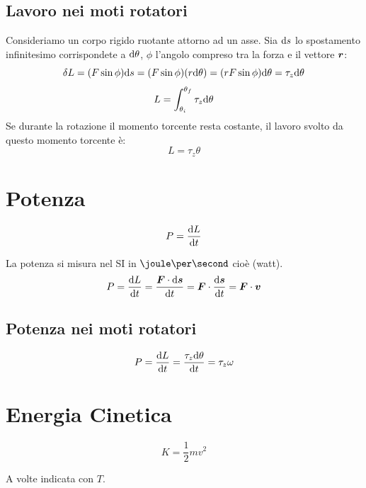 \subsection{Lavoro nei moti rotatori}
Consideriamo un corpo rigido ruotante attorno ad un asse. Sia $\mathrm{d} s$ lo spostamento
infinitesimo corrispondete a $\mathrm{d} \theta$, $\phi$ l'angolo
compreso tra la forza e il vettore $\boldsymbol{r}$:
\begin{equation*}
\delta L=(F\sin \phi)\mathrm{d} s=(F \sin \phi)(r
\mathrm{d}\theta)=(rF\sin\phi)\mathrm{d} \theta=\tau_z\mathrm{d}\theta
\end{equation*}
\begin{equation*}L=\int_{\theta_i}^{\theta_f}\tau_z\mathrm{d}\theta\end{equation*}
Se durante la rotazione il momento torcente resta costante, il
lavoro svolto da questo momento torcente è:
\begin{equation*}L=\tau_z\theta\end{equation*}
\section{Potenza}
\begin{Def}[potenza]
 \begin{equation*}P=\frac{\mathrm{d} L}{\mathrm{d} t}\end{equation*}
\end{Def}
La potenza si misura nel SI in $\joule\per\second$ cioè \watt(watt).
\[P=\frac{\mathrm{d} L}{\mathrm{d} t}=\frac{\boldsymbol{F}\cdot\mathrm{d} \boldsymbol{s}}{\mathrm{d} t}=\boldsymbol{F}\cdot\frac{\mathrm{d} \boldsymbol{s}}{\mathrm{d}
t}=\boldsymbol{F}\cdot \boldsymbol{v}\]
\subsection{Potenza nei moti rotatori}
\[P=\frac{\mathrm{d} L}{\mathrm{d} t}=\frac{\tau_z\mathrm{d}\theta}{\mathrm{d}
t}=\tau_z\omega\]

\section[Energia Cinetica]{Energia Cinetica}
\begin{Def}
\begin{equation*}K=\frac{1}{2}mv^2\end{equation*}
\end{Def}
A volte indicata con $T$.
